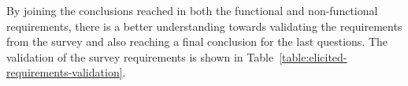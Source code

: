 By joining the conclusions reached in both the functional and non-functional requirements, there is a better understanding  towards validating the requirements from the survey and also reaching a final conclusion for the last questions. The validation of the survey requirements is shown in Table~\ref{table:elicited-requirements-validation}.

	\begin{table}[]
		\centering
\end{table}
